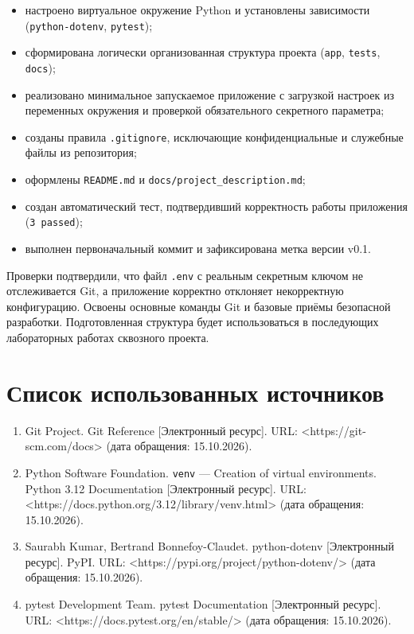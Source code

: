 \documentclass[12pt,a4paper]{article}
\begin{document}
\begin{itemize}
\item настроено виртуальное окружение Python и установлены зависимости (\texttt{python-dotenv}, \texttt{pytest});
\item сформирована логически организованная структура проекта (\texttt{app}, \texttt{tests}, \texttt{docs});
\item реализовано минимальное запускаемое приложение с загрузкой настроек из переменных окружения и проверкой обязательного секретного параметра;
\item созданы правила \texttt{.\allowbreak{}gitignore}, исключающие конфиденциальные и служебные файлы из репозитория;
\item оформлены \texttt{README.\allowbreak{}md} и \texttt{docs/\allowbreak{}project\_description.\allowbreak{}md};
\item создан автоматический тест, подтвердивший корректность работы приложения (\texttt{3 passed});
\item выполнен первоначальный коммит и зафиксирована метка версии v0.1.
\end{itemize}
Проверки подтвердили, что файл \texttt{.\allowbreak{}env} с реальным секретным ключом не отслеживается Git, а приложение корректно отклоняет некорректную конфигурацию. Освоены основные команды Git и базовые приёмы безопасной разработки. Подготовленная структура будет использоваться в последующих лабораторных работах сквозного проекта.

\clearpage
\section{Список использованных источников}

\begin{enumerate}
\item Git Project. Git Reference [Электронный ресурс]. URL: <https://git-scm.com/docs> (дата обращения: 15.10.2026).
\item Python Software Foundation. \texttt{venv} — Creation of virtual environments. Python 3.12 Documentation [Электронный ресурс]. URL: <https://docs.python.org/3.12/library/venv.html> (дата обращения: 15.10.2026).
\item Saurabh Kumar, Bertrand Bonnefoy-Claudet. python-dotenv [Электронный ресурс]. PyPI. URL: <https://pypi.org/project/python-dotenv/> (дата обращения: 15.10.2026).
\item pytest Development Team. pytest Documentation [Электронный ресурс]. URL: <https://docs.pytest.org/en/stable/> (дата обращения: 15.10.2026).
\end{enumerate}
\end{document}
